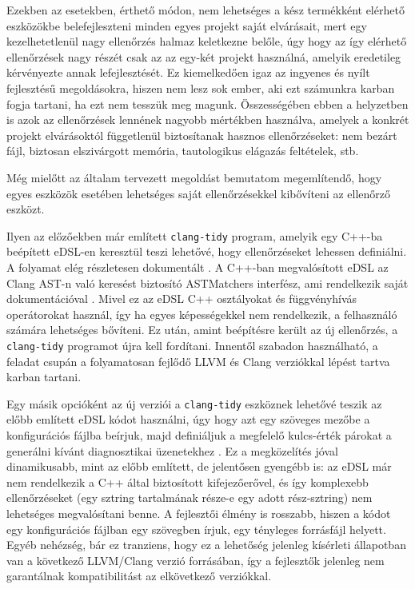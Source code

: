Ezekben az esetekben, érthető módon, nem lehetséges a kész termékként elérhető eszközökbe belefejleszteni minden egyes projekt saját elvárásait, mert egy kezelhetetlenül nagy ellenőrzés halmaz keletkezne belőle, úgy hogy az így elérhető ellenőrzések nagy részét csak az az egy-két projekt használná, amelyik eredetileg kérvényezte annak lefejlesztését.
Ez kiemelkedően igaz az ingyenes és nyílt fejlesztésű megoldásokra, hiszen nem lesz sok ember, aki ezt számunkra karban fogja tartani, ha ezt nem tesszük meg magunk.
Összességében ebben a helyzetben is azok az ellenőrzések lennének nagyobb mértékben használva, amelyek a konkrét projekt elvárásoktól függetlenül biztosítanak hasznos ellenőrzéseket: nem bezárt fájl, biztosan elszivárgott memória, tautologikus elágazás feltételek, stb.

Még mielőtt az általam tervezett megoldást bemutatom megemlítendő, hogy egyes eszközök esetében lehetséges saját ellenőrzésekkel kibővíteni az ellenőrző eszközt.

Ilyen az előzőekben már említett {\tt clang-tidy} program, amelyik egy C++-ba beépített \gls{eDSL}-en keresztül teszi lehetővé, hogy ellenőrzéseket lehessen definiálni.
A folyamat elég részletesen dokumentált \cite{llvmprojectGettingInvolvedExtra2025}.
A C++-ban megvalósított \gls{eDSL} az Clang \gls{AST}-n való keresést biztosító \gls{AST}Matchers interfész, ami rendelkezik saját dokumentációval \cite{llvmprojectASTMatcherReference2025}.
Mivel ez az \gls{eDSL} C++ osztályokat és függvényhívás operátorokat használ, így ha egyes képességekkel nem rendelkezik, a felhasználó számára lehetséges bővíteni.
Ez után, amint beépítésre került az új ellenőrzés, a {\tt clang-tidy} programot újra kell fordítani.
Innentől szabadon használható, a feladat csupán a folyamatosan fejlődő LLVM és Clang verziókkal lépést tartva karban tartani.

Egy másik opcióként az új verziói a {\tt clang-tidy} eszköznek lehetővé teszik az előbb említett \gls{eDSL} kódot használni, úgy hogy azt egy szöveges mezőbe a konfigurációs fájlba beírjuk, majd definiáljuk a megfelelő kulcs-érték párokat a generálni kívánt diagnosztikai üzenetekhez \cite{llvmprojectQueryBasedCustom2025}.
Ez a megközelítés jóval dinamikusabb, mint az előbb említett, de jelentősen gyengébb is: az \gls{eDSL} már nem rendelkezik a C++ által biztosított kifejezőerővel, és így komplexebb ellenőrzéseket (\pl egy sztring tartalmának része-e egy adott rész-sztring) nem lehetséges megvalósítani benne.
A fejlesztői élmény is rosszabb, hiszen a kódot egy konfigurációs fájlban egy szövegben írjuk, egy tényleges forrásfájl helyett.
Egyéb nehézség, bár ez tranziens, hogy ez a lehetőség jelenleg kísérleti állapotban van a következő LLVM/Clang verzió forrásában, így a fejlesztők jelenleg nem garantálnak kompatibilitást az elkövetkező verziókkal.

